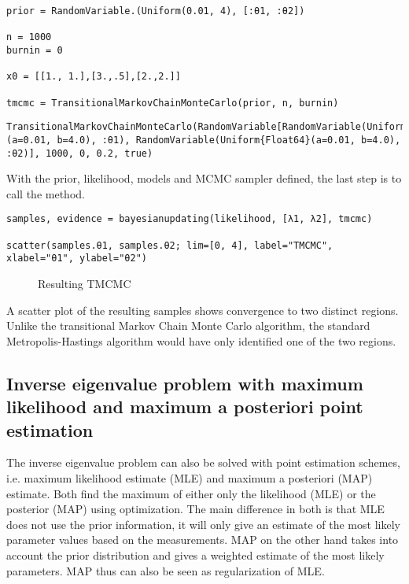 \begin{verbatim}
prior = RandomVariable.(Uniform(0.01, 4), [:θ1, :θ2])

n = 1000
burnin = 0

x0 = [[1., 1.],[3.,.5],[2.,2.]]

tmcmc = TransitionalMarkovChainMonteCarlo(prior, n, burnin)
\end{verbatim}


\begin{verbatim}
TransitionalMarkovChainMonteCarlo(RandomVariable[RandomVariable(Uniform{Float64}(a=0.01, b=4.0), :θ1), RandomVariable(Uniform{Float64}(a=0.01, b=4.0), :θ2)], 1000, 0, 0.2, true)
\end{verbatim}



With the prior, likelihood, models and  MCMC sampler defined, the last step is to call the  method.




\begin{verbatim}
samples, evidence = bayesianupdating(likelihood, [λ1, λ2], tmcmc)

scatter(samples.θ1, samples.θ2; lim=[0, 4], label="TMCMC", xlabel="θ1", ylabel="θ2")
\end{verbatim}



\begin{figure}
\centering
\caption{Resulting TMCMC}
\end{figure}
  A scatter plot of the resulting samples shows convergence to two distinct regions. Unlike the transitional Markov Chain Monte Carlo algorithm, the standard Metropolis-Hastings algorithm would have only identified one of the two regions.



\subsection{Inverse eigenvalue problem with maximum likelihood and maximum a posteriori point estimation}



\label{6789376627140577471}{}


The inverse eigenvalue problem can also be solved with point estimation schemes, i.e. maximum likelihood estimate (MLE) and maximum a posteriori (MAP) estimate. Both find the maximum of either only the likelihood (MLE) or the posterior (MAP) using optimization. The main difference in both is that MLE does not use the prior information, it will only give an estimate of the most likely parameter values based on the measurements. MAP on the other hand takes into account the prior distribution and gives a weighted estimate of the most likely parameters. MAP thus can also be seen as regularization of MLE.



